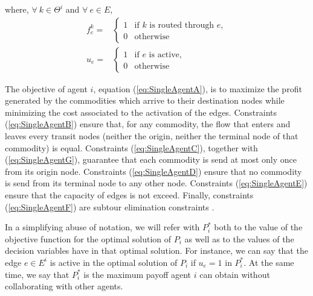 \documentclass[authoryear]{elsarticle}
\begin{document}
where, $\forall\ k\in \Theta^i$ and  $\forall\ e \in E$,
\[
\begin{array}{rl}
f_e^k = & \begin{cases}
    1 & \text{if } k \text{ is routed through } e,\\
    0 & \text{otherwise}
\end{cases}  \\[20pt]
u_e = &\begin{cases}
    1 & \text{if } e \text{ is active},\\
    0 & \text{otherwise}    
\end{cases}
\end{array}
\]

The objective of agent $i$, equation (\ref{eq:SingleAgentA}), is to maximize the
profit generated by the commodities which arrive to their destination nodes
while minimizing the cost associated to the activation of the edges. Constraints
(\ref{eq:SingleAgentB}) ensure that, for any commodity, the flow that enters
and leaves every transit nodes (neither the origin, neither the terminal node of
that commodity) is equal. Constraints (\ref{eq:SingleAgentC}), together with
(\ref{eq:SingleAgentG}), guarantee that each commodity is send at most only once
from its origin node. Constraints (\ref{eq:SingleAgentD}) ensure that no
commodity is send from its terminal node to any other node. Constraints (\ref{eq:SingleAgentE})
ensure that the capacity of edges is not exceed. Finally, constraints
(\ref{eq:SingleAgentF}) are subtour elimination constraints \citep{AHUJA1993}. 


In a simplifying abuse of notation, we will refer with $P_i^*$ both to the value of the objective function for the optimal solution of $P_i$ as well as to the values of the decision variables have in that optimal solution. For instance, we can say that the edge $e\in E^i$ is active in the optimal solution of $P_i$ if $u_e=1$ in $P_i^*$. At the same time, we say that $P_i^*$ is the maximum payoff agent $i$ can obtain without collaborating with other agents.
\end{document}
